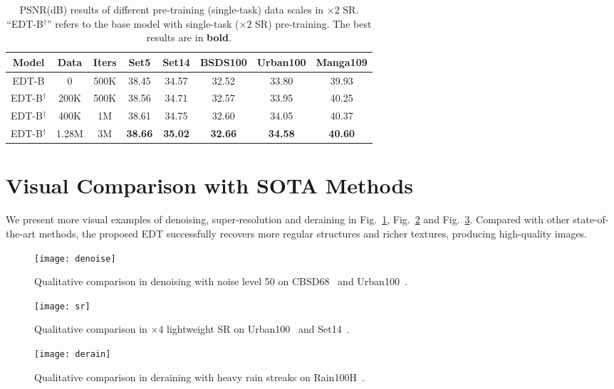 \documentclass[runningheads]{llncs}
\begin{document}
	\begin{table}[t]
		\caption{PSNR(dB) results of different pre-training (single-task) data scales in $\times 2$ SR. ``EDT-B$^\dagger$'' refers to the base model with single-task ($\times 2$ SR) pre-training. The best results are in \textbf{bold}.}
\setlength\tabcolsep{4pt}
		\begin{center}
\begin{tabular}{| c | c | c | c  c  c  c  c|}
				\hline
				Model & Data & Iters & Set5 & Set14 & BSDS100 & Urban100 & Manga109 \\
				\hline
				EDT-B & 0 & 500K & 38.45 & 34.57 & 32.52 & 33.80 & 39.93 \\
				\hline
				EDT-B$^\dagger$ & 200K & 500K & 38.56 & 34.71 & 32.57 & 33.95 & 40.25 \\
				EDT-B$^\dagger$ & 400K & 1M & 38.61 & 34.75 & 32.60 & 34.05 & 40.37 \\	
				EDT-B$^\dagger$ & 1.28M & 3M & \textbf{38.66} & \textbf{35.02} & \textbf{32.66} & \textbf{34.58} & \textbf{40.60} \\		
				\hline
			\end{tabular}
\end{center}
\vspace{-0.1in}
		\label{tab:full_data}
	\end{table} 
	
	


	\section{Visual Comparison with SOTA Methods}
	
	We present more visual examples of denoising, super-resolution and deraining in Fig.~\ref{fig:denoise}, Fig.~\ref{fig:sr} and Fig.~\ref{fig:derain}. Compared with other state-of-the-art methods, the proposed EDT successfully recovers more regular structures and richer textures, producing high-quality images.
	
	\begin{figure}[h]
		\begin{center}
			\texttt{[image: denoise]}
		\end{center}
		\caption{Qualitative comparison in denoising with noise level 50 on CBSD68~\cite{martin2001database} and Urban100~\cite{huang2015single}.}
		\label{fig:denoise}
	\end{figure}
	
	\begin{figure}[t]
		\begin{center}
			\texttt{[image: sr]}
		\end{center}
		\caption{Qualitative comparison in $\times 4$ lightweight SR on Urban100~\cite{huang2015single} and Set14~\cite{zeyde2010single}.}
		\label{fig:sr}
	\end{figure}
	
	\begin{figure}[t]
		\begin{center}
			\texttt{[image: derain]}
		\end{center}
		\caption{Qualitative comparison in deraining with heavy rain streaks on Rain100H~\cite{yang2019joint}.}
		\label{fig:derain}
	\end{figure}
\end{document}
